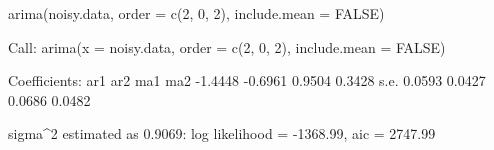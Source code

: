 \begin{Schunk}
\begin{Sinput}
 arima(noisy.data, order = c(2, 0, 2), include.mean = FALSE)
\end{Sinput}
\begin{Soutput}
Call:
arima(x = noisy.data, order = c(2, 0, 2), include.mean = FALSE)

Coefficients:
          ar1      ar2     ma1     ma2
      -1.4448  -0.6961  0.9504  0.3428
s.e.   0.0593   0.0427  0.0686  0.0482

sigma^2 estimated as 0.9069:  log likelihood = -1368.99,  aic = 2747.99
\end{Soutput}
\end{Schunk}
